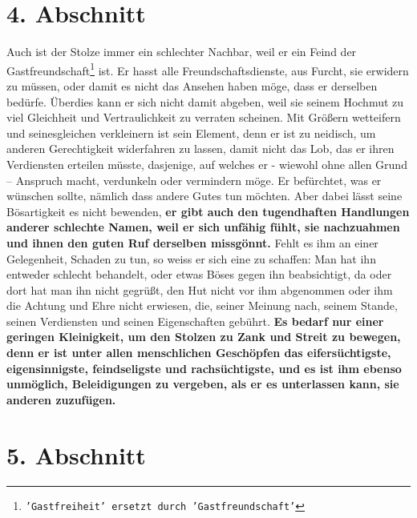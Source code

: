 \section{4. Abschnitt} \label{kap12_ab4}

Auch ist der Stolze immer ein schlechter Nachbar, weil er ein Feind der
Gastfreundschaft\footnote{\texttt{'Gastfreiheit' ersetzt durch
'Gastfreundschaft'}}
 ist. Er hasst alle
Freundschaftsdienste, aus Furcht, sie erwidern
zu müssen, oder damit es nicht das Ansehen haben möge, dass er derselben
bedürfe.
Überdies kann er sich nicht damit abgeben, weil sie seinem Hochmut zu viel
Gleichheit und Vertraulichkeit zu verraten scheinen. Mit
Größern wetteifern und
seinesgleichen verkleinern ist sein Element, denn er ist zu neidisch, um
anderen Gerechtigkeit widerfahren zu lassen, damit nicht das Lob, das
er ihren
Verdiensten erteilen müsste, dasjenige, auf welches er - wiewohl ohne allen
Grund -- Anspruch macht, verdunkeln oder vermindern möge. Er befürchtet, was er
wünschen sollte, nämlich dass andere Gutes tun möchten. Aber dabei lässt seine
Bösartigkeit es nicht bewenden, \label{ref:12_04_eitle_menschen_tugent}
\textbf{er gibt auch den tugendhaften Handlungen
anderer schlechte Namen, weil er sich unfähig fühlt, sie nachzuahmen und ihnen
den guten Ruf derselben missgönnt.} Fehlt es ihm an einer Gelegenheit, Schaden
zu
tun, so weiss er sich eine zu schaffen: Man hat ihn entweder schlecht behandelt,
oder etwas Böses gegen ihn beabsichtigt, da oder dort hat man ihn nicht gegrüßt,
den Hut nicht vor ihm abgenommen oder ihm die Achtung und Ehre nicht erwiesen,
die, seiner Meinung nach, seinem Stande, seinen Verdiensten und seinen
Eigenschaften gebührt. \label{ref:12_04_eitle_menschen_beleidigung}
\textbf{Es bedarf nur einer geringen Kleinigkeit, um den
Stolzen
zu Zank und Streit zu bewegen, denn er ist unter allen
menschlichen Geschöpfen
das eifersüchtigste, eigensinnigste, feindseligste und rachsüchtigste, und es
ist ihm ebenso unmöglich, Beleidigungen zu vergeben, als er es unterlassen kann,
sie anderen zuzufügen.}

\section{5. Abschnitt} \label{kap12_ab5}

